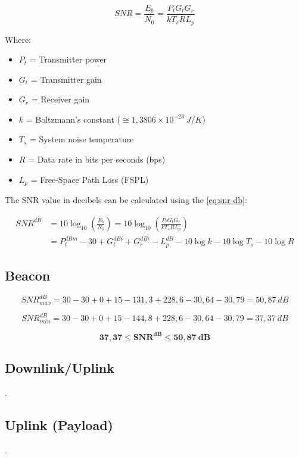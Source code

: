 \begin{equation} \label{eq:snr}
SNR = \frac{E_{b}}{N_{0}} = \frac{P_{t}G_{t}G_{r}}{kT_{s}RL_{p}}
\end{equation}

Where:

\begin{itemize}
    \item $P_{t}$ = Transmitter power
    \item $G_{t}$ = Transmitter gain
    \item $G_{r}$ = Receiver gain
    \item $k$ = Boltzmann's constant ($\cong 1,3806 \times 10^{-23}\ J/K$)
    \item $T_{s}$ = System noise temperature
    \item $R$ = Data rate in bits per seconds (bps)
    \item $L_{p}$ = Free-Space Path Loss (FSPL)
\end{itemize}

The SNR value in decibels can be calculated using the \autoref{eq:snr-db}:

\begin{equation} \label{eq:snr-db}
    \begin{split}
        SNR^{dB} & = 10\log_{10}\left( \frac{E_{b}}{N_{0}} \right) = 10\log_{10} \left( \frac{P_{t}G_{t}G_{r}}{kT_{s}RL_{p}} \right) \\
                 & = P_{t}^{dBm} - 30 + G_{t}^{dBi} + G_{r}^{dBi} - L_{p}^{dB} - 10\log k - 10\log T_{s} - 10\log R
    \end{split}
\end{equation}

\subsection{Beacon}

\begin{equation}
SNR^{dB}_{max} = 30 - 30 + 0 + 15 - 131,3 + 228,6 - 30,64 - 30,79 = 50,87\ dB
\end{equation}

\begin{equation}
SNR^{dB}_{min} = 30 - 30 + 0 + 15 - 144,8 + 228,6 -30,64 -30,79 = 37,37\ dB
\end{equation}

\begin{equation}
\mathbf{37,37 \leq SNR^{dB} \leq 50,87\ dB}
\end{equation}

\subsection{Downlink/Uplink}

.

\subsection{Uplink (Payload)}

.
